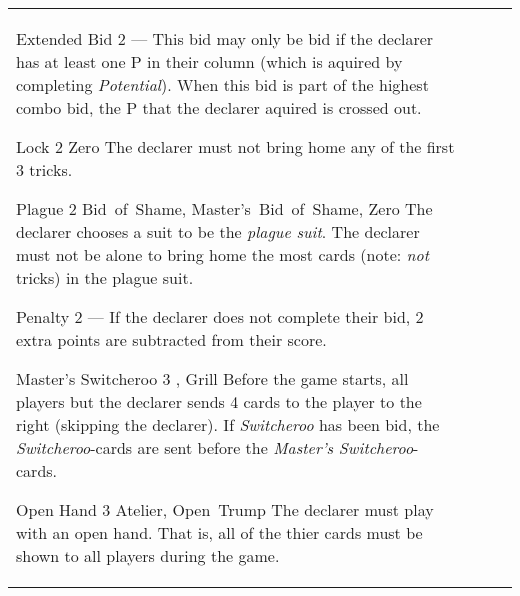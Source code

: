 \begin{table}
\begin{center}
\begin{tabularx}{\textwidth}{
			l
			S[table-number-alignment=center, table-figures-decimal=0]
			p{3cm}
			|X
		}
			\specialBidItem%
			{Extended Bid}
			{2}
			{---}
			{%
				This bid may only be bid if the declarer has at least one P in their column (which is aquired by completing \emph{Potential}). When this bid is part of the highest combo bid, the P that the declarer aquired is crossed out.
			}

			\specialBidItem%
			{Lock}
			{2}
			{Zero}
			{%
				The declarer must not bring home any of the first 3 tricks.
			}

			\specialBidItem%
			{Plague}
			{2}
			{Bid~of~Shame, Master's~Bid~of~Shame, Zero}
			{%
				The declarer chooses a suit to be the \emph{plague suit}. The declarer must not be alone to bring home the most cards (note: \emph{not} tricks) in the plague suit.
			}

			\specialBidItem%
			{Penalty}
			{2}
			{---}
			{%
				If the declarer does not complete their bid, 2 extra points are subtracted from their score.
			}

			\specialBidItem%
			{Master's Switcheroo}
			{3}
			{\nonTrump, Grill}
			{%
				Before the game starts, all players but the declarer sends 4 cards to the player to the right (skipping the declarer). If \emph{Switcheroo} has been bid, the \emph{Switcheroo}-cards are sent before the \emph{Master's Switcheroo}-cards.
			}

			\specialBidItem%
			{Open Hand}
			{3}
			{Atelier, Open~Trump}
			{%
				The declarer must play with an open hand. That is, all of the thier cards must be shown to all players during the game.
			}
		\end{tabularx}
	\end{center}
\end{table}
